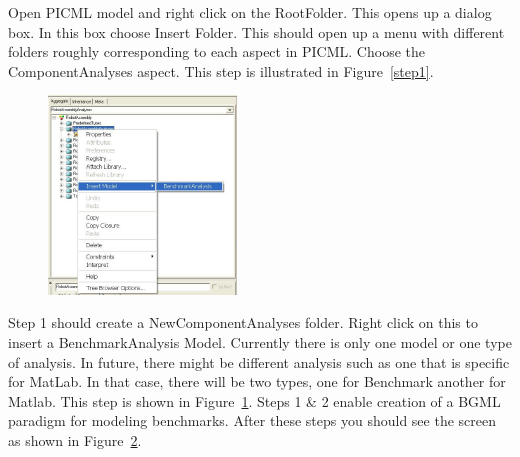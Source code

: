 \documentclass[onecolumn]{article}
\begin{document}
Open PICML model and right click on the RootFolder. This opens up a
dialog box. In this box choose Insert Folder. This should open up a
menu with different folders roughly corresponding to each aspect in
PICML. Choose the ComponentAnalyses aspect. This step is illustrated in
Figure~\ref{step1}.

\begin{figure}[ht]
{
 \includegraphics[width=5cm]{Insert-Benchmark.png}
  \label{step2}
}
\end{figure}

Step 1 should create a NewComponentAnalyses folder. Right click
on this to insert a BenchmarkAnalysis Model. Currently there is only
one model or one type of analysis. In future, there might be different
analysis such as one that is specific for MatLab. In that case, there
will be two types, one for Benchmark another for Matlab. This step is
shown in Figure~\ref{step2}. Steps 1 \& 2 enable creation of a BGML
paradigm for modeling benchmarks. After these steps you should see the
screen as shown in Figure~\ref{step3}.

\begin{figure}[htpb]
\label{step3}
\end{figure}
\end{document}
